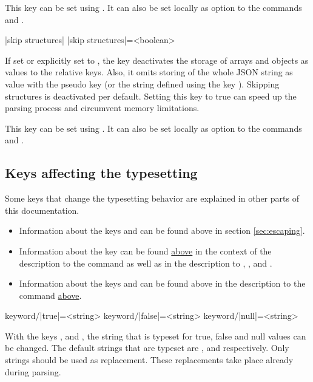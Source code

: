 \documentclass[a4paper]{article}
\begin{document}
{{This key can be set using \macro{\JSONParseSet}. It can also be set locally as option to the commands \macro{\JSONParse} and \macro{\JSONParseFromFile}.

\begin{macrodef}
|skip structures|
|skip structures|={<boolean>}
\end{macrodef}
If set or explicitly set to , the key  deactivates the storage of arrays and objects as values to the relative keys. Also, it omits storing of the whole JSON string as value with the pseudo key  (or the string defined using the key ). Skipping structures is deactivated per default. Setting this key to true can speed up the parsing process and circumvent memory limitations.

This key can be set using \macro{\JSONParseSet}. It can also be set locally as option to the commands \macro{\JSONParse} and \macro{\JSONParseFromFile}.

\subsection{Keys affecting the typesetting}

Some keys that change the typesetting behavior are explained in other parts of this documentation.

\begin{itemize}
\item Information about the keys  and  can be found above in section \ref{sec:escaping}.
\item Information about the key  can be found \hyperlink{key:storein}{above} in the context of the description to the command \macro{\JSONParseValue} as well as in the description to \macro{\JSONParseKeys}, \macro{\JSONParseArrayCount}, \macro{\JSONParseArrayUse} and \macro{\JSONParseArrayMapInline}.
\item Information about the keys  and  can be found above in the description to the command \macro{\JSONParseArrayMapFunction} \hyperlink{macro:arraymapfunction}{above}.
\end{itemize}

\begin{macrodef}
keyword/|true|={<string>}
keyword/|false|={<string>}
keyword/|null|={<string>}
\end{macrodef}
With the keys ,  and , the string that is typeset for true, false and null values can be changed. The default strings that are typeset are ,  and  respectively. Only strings should be used as replacement. These replacements take place already during parsing.

}}
\end{document}
